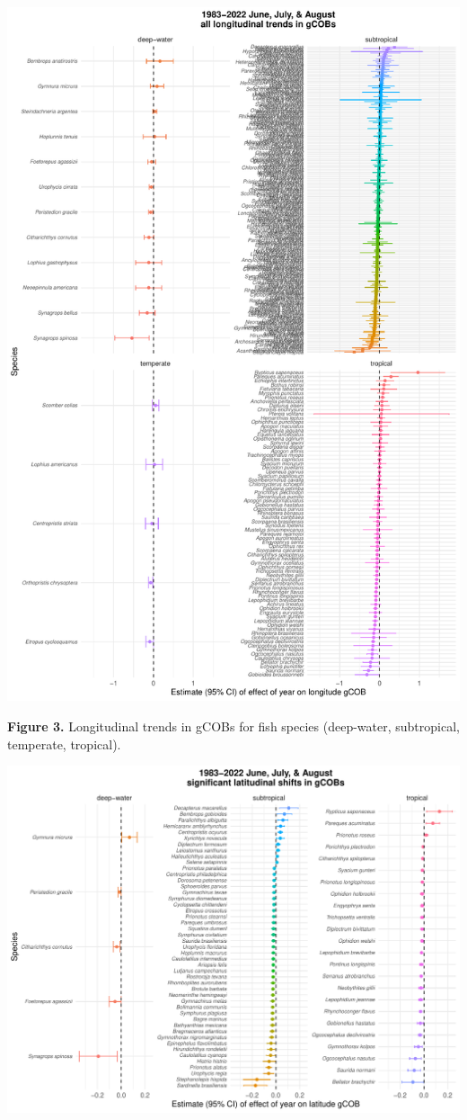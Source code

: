 \documentclass[
  letterpaper,
  DIV=11,
  numbers=noendperiod]{scrartcl}
\begin{document}
\includegraphics{9_westernGoM_summer_files/figure-pdf/Fig_3-1.pdf}

\textbf{Figure 3.} Longitudinal trends in gCOBs for fish species
(deep-water, subtropical, temperate, tropical).

\newpage

\includegraphics{9_westernGoM_summer_files/figure-pdf/Fig_4-1.pdf}
\end{document}
